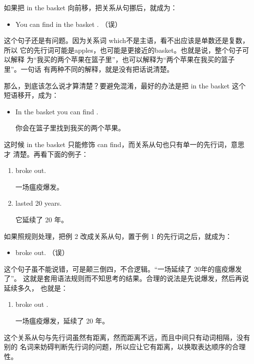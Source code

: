 如果把 in the basket 向前移，把关系从句挪后，就成为：
\begin{itemize}
\item You can find  in the basket
  . （误）
\end{itemize}
这个句子还是有问题。因为关系词 which不是主语，看不出应该是单数还是复数，所以
它的先行词可能是apples，也可能是更接近的basket。也就是说，整个句子可以解释
为“我买的两个苹果在篮子里”，也可以解释为“两个苹果在我买的篮子里”。一句话
有两种不同的解释，就是没有把话说清楚。

那么，到底该怎么说才算清楚？要避免混淆，最好的办法是把 in the basket
这个短语移开，成为：
\begin{itemize}
\item In the basket you can find  .

  你会在篮子里找到我买的两个苹果。
\end{itemize}
这时候 in the basket 只能修饰 can find，而关系从句也只有单一的先行词，意思才
清楚。再看下面的例子：
\begin{enumerate}
\item {} broke out.

  一场瘟疫爆发。
\item {} lasted 20 years.

  它延续了 20 年。
\end{enumerate}

如果照规则处理，把例 2 改成关系从句，置于例 1 的先行词之后，就成为：
\begin{itemize}
\item {}  broke out. （误）
\end{itemize}
这个句子虽不能说错，可是颠三倒四，不合逻辑。“一场延续了 20年的瘟疫爆发了”。
这就是套用语法规则而不知思考的结果。合理的说法是先说爆发，然后再说延续多久，
也就是：

\begin{enumerate}[resume]
\item {} broke out .

  一场瘟疫爆发，延续了 20 年。
\end{enumerate}
这个关系从句与先行词虽然有距离，然而距离不远，而且中间只有动词相隔，没有别的
名词来妨碍判断先行词的问题，所以应让它有距离，以换取表达顺序的合理性。


